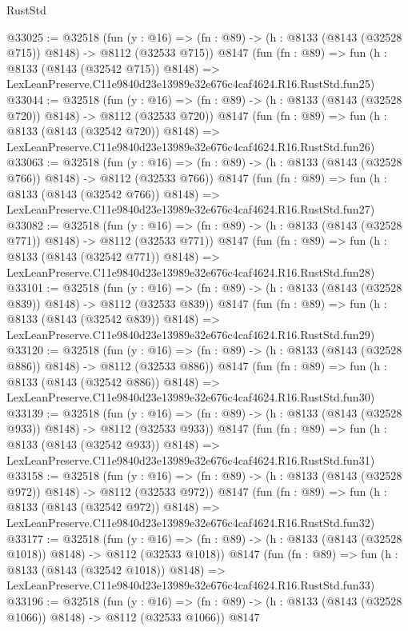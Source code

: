 \begin{lexlean}{RustStd}
\begin{coremodule}
@33025 := @32518
    (fun (y : @16) => (fn : @89) -> (h : @8133 (@8143 (@32528 @715)) @8148) -> @8112 (@32533 @715))
    @8147
    (fun (fn : @89) =>
    fun (h : @8133 (@8143 (@32542 @715)) @8148) =>
    LexLeanPreserve.C11e9840d23e13989e32e676c4caf4624.R16.RustStd.fun25)
@33044 := @32518
    (fun (y : @16) => (fn : @89) -> (h : @8133 (@8143 (@32528 @720)) @8148) -> @8112 (@32533 @720))
    @8147
    (fun (fn : @89) =>
    fun (h : @8133 (@8143 (@32542 @720)) @8148) =>
    LexLeanPreserve.C11e9840d23e13989e32e676c4caf4624.R16.RustStd.fun26)
@33063 := @32518
    (fun (y : @16) => (fn : @89) -> (h : @8133 (@8143 (@32528 @766)) @8148) -> @8112 (@32533 @766))
    @8147
    (fun (fn : @89) =>
    fun (h : @8133 (@8143 (@32542 @766)) @8148) =>
    LexLeanPreserve.C11e9840d23e13989e32e676c4caf4624.R16.RustStd.fun27)
@33082 := @32518
    (fun (y : @16) => (fn : @89) -> (h : @8133 (@8143 (@32528 @771)) @8148) -> @8112 (@32533 @771))
    @8147
    (fun (fn : @89) =>
    fun (h : @8133 (@8143 (@32542 @771)) @8148) =>
    LexLeanPreserve.C11e9840d23e13989e32e676c4caf4624.R16.RustStd.fun28)
@33101 := @32518
    (fun (y : @16) => (fn : @89) -> (h : @8133 (@8143 (@32528 @839)) @8148) -> @8112 (@32533 @839))
    @8147
    (fun (fn : @89) =>
    fun (h : @8133 (@8143 (@32542 @839)) @8148) =>
    LexLeanPreserve.C11e9840d23e13989e32e676c4caf4624.R16.RustStd.fun29)
@33120 := @32518
    (fun (y : @16) => (fn : @89) -> (h : @8133 (@8143 (@32528 @886)) @8148) -> @8112 (@32533 @886))
    @8147
    (fun (fn : @89) =>
    fun (h : @8133 (@8143 (@32542 @886)) @8148) =>
    LexLeanPreserve.C11e9840d23e13989e32e676c4caf4624.R16.RustStd.fun30)
@33139 := @32518
    (fun (y : @16) => (fn : @89) -> (h : @8133 (@8143 (@32528 @933)) @8148) -> @8112 (@32533 @933))
    @8147
    (fun (fn : @89) =>
    fun (h : @8133 (@8143 (@32542 @933)) @8148) =>
    LexLeanPreserve.C11e9840d23e13989e32e676c4caf4624.R16.RustStd.fun31)
@33158 := @32518
    (fun (y : @16) => (fn : @89) -> (h : @8133 (@8143 (@32528 @972)) @8148) -> @8112 (@32533 @972))
    @8147
    (fun (fn : @89) =>
    fun (h : @8133 (@8143 (@32542 @972)) @8148) =>
    LexLeanPreserve.C11e9840d23e13989e32e676c4caf4624.R16.RustStd.fun32)
@33177 := @32518
    (fun (y : @16) =>
    (fn : @89) -> (h : @8133 (@8143 (@32528 @1018)) @8148) -> @8112 (@32533 @1018))
    @8147
    (fun (fn : @89) =>
    fun (h : @8133 (@8143 (@32542 @1018)) @8148) =>
    LexLeanPreserve.C11e9840d23e13989e32e676c4caf4624.R16.RustStd.fun33)
@33196 := @32518
    (fun (y : @16) =>
    (fn : @89) -> (h : @8133 (@8143 (@32528 @1066)) @8148) -> @8112 (@32533 @1066))
    @8147

\end{coremodule}
\end{lexlean}
